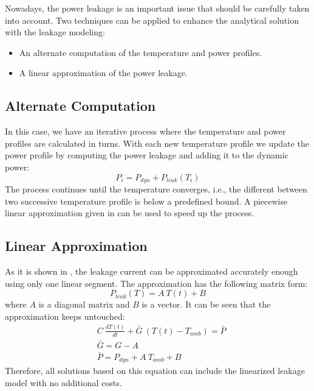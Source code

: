 Nowadays, the power leakage is an important issue that should be carefully taken into account. Two techniques can be applied to enhance the analytical solution with the leakage modeling:
  \begin{itemize}
    \item An alternate computation of the temperature and power profiles.
    \item A linear approximation of the power leakage.
  \end{itemize}

\subsection{Alternate Computation}
In this case, we have an iterative process where the temperature and power profiles are calculated in turns. With each new temperature profile we update the power profile by computing the power leakage and adding it to the dynamic power:
\[
  P_i = P_{dyn} + P_{leak}(T_i)
\]
The process continues until the temperature converges, i.e., the different between two successive temperature profile is below a predefined bound. A piecewise linear approximation given in \cite{liu2007} can be used to speed up the process.

\subsection{Linear Approximation}
As it is shown in \cite{liu2007}, the leakage current can be approximated accurately enough using only one linear segment. The approximation has the following matrix form:
\[
  P_{leak}(T) = A \: T(t) + B
\]
where $A$ is a diagonal matrix and $B$ is a vector. It can be seen that the approximation keeps  untouched:
\begin{align*}
  & C \: \frac{dT(t)}{dt} + \bar{G} \: (T(t) - T_{amb}) = \bar{P} \\
  & \bar{G} = G - A \\
  & \bar{P} = P_{dyn} + A \: T_{amb} + B
\end{align*}
Therefore, all solutions based on this equation can include the linearized leakage model with no additional costs.
